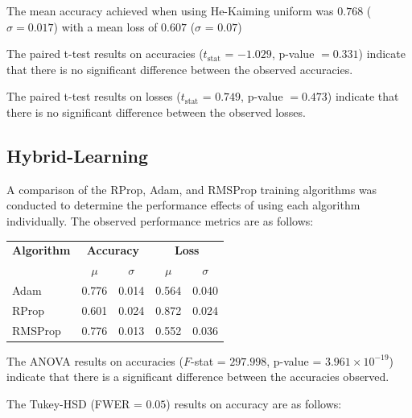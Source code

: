The mean accuracy achieved when using He-Kaiming uniform was $0.768$ ($\sigma = 0.017$) with a mean loss of $0.607$ ($\sigma$ = $0.07$)

The paired t-test results on accuracies ($t_{\text{stat}}$ = $-1.029$, 
p-value $= 0.331$) indicate that there is no significant difference between the observed accuracies.

The paired t-test results on losses ($t_{\text{stat}}$ = $0.749$, 
p-value $= 0.473$) indicate that there is no significant difference between the observed losses.

\subsection{Hybrid-Learning}

A comparison of the RProp, Adam, and RMSProp training algorithms was conducted to determine the performance effects
of using each algorithm individually. The observed performance metrics are as follows: \\

\noindent
\footnotesize
\setlength{\tabcolsep}{6pt} %
\renewcommand{\arraystretch}{1.0} %
\begin{center}
\begin{tabular}{l|cc|cc}
\toprule
\textbf{Algorithm} & \multicolumn{2}{c|}{\textbf{Accuracy}} & \multicolumn{2}{c}{\textbf{Loss}} \\
\cmidrule(r){2-3} \cmidrule(l){4-5}
 & $\mu$ & $\sigma$ & $\mu$ & $\sigma$ \\
\midrule 
Adam   & 0.776 & 0.014 & 0.564 & 0.040 \\
RProp  & 0.601 & 0.024 & 0.872 & 0.024 \\
RMSProp & 0.776 & 0.013 & 0.552 & 0.036 \\
\bottomrule
\end{tabular}
\end{center}

\normalsize

\vspace{0.7em}

The ANOVA results on accuracies ($F$-stat = $297.998$, p-value = $3.961 \times 10^{-19}$) 
indicate that there is a significant difference between the accuracies observed.

The Tukey-HSD (FWER = $0.05$) results on accuracy are as follows: \\

\noindent
{} \\

